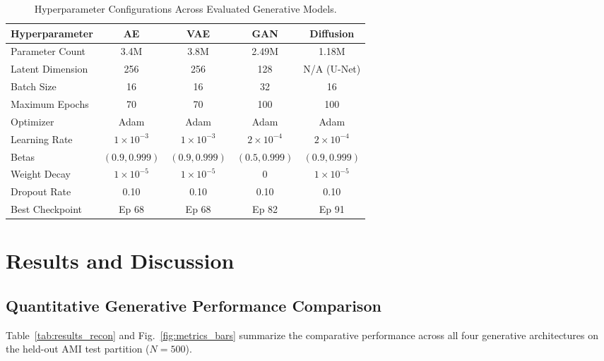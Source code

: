 \documentclass[conference]{IEEEtran}
\begin{document}
\begin{table}[h]
\caption{Hyperparameter Configurations Across Evaluated Generative Models.}
\label{tab:hyperparams}
\centering
\small
\begin{tabular}{lcccc}
\toprule
\textbf{Hyperparameter} & \textbf{AE} & \textbf{VAE} & \textbf{GAN} & \textbf{Diffusion} \\
\midrule
Parameter Count & 3.4M & 3.8M & 2.49M & 1.18M \\
Latent Dimension & 256 & 256 & 128 & N/A (U-Net) \\
Batch Size & 16 & 16 & 32 & 16 \\
Maximum Epochs & 70 & 70 & 100 & 100 \\
Optimizer & Adam & Adam & Adam & Adam \\
Learning Rate & $1\times 10^{-3}$ & $1\times 10^{-3}$ & $2\times 10^{-4}$ & $2\times 10^{-4}$ \\
Betas & $(0.9, 0.999)$ & $(0.9, 0.999)$ & $(0.5, 0.999)$ & $(0.9, 0.999)$ \\
Weight Decay & $1\times 10^{-5}$ & $1\times 10^{-5}$ & 0 & $1\times 10^{-5}$ \\
Dropout Rate & 0.10 & 0.10 & 0.10 & 0.10 \\
Best Checkpoint & Ep 68 & Ep 68 & Ep 82 & Ep 91 \\
\bottomrule
\end{tabular}
\end{table}

\section{Results and Discussion}
\label{sec:results}

\subsection{Quantitative Generative Performance Comparison}
Table~\ref{tab:results_recon} and Fig.~\ref{fig:metrics_bars} summarize the comparative performance across all four generative architectures on the held-out AMI test partition ($N = 500$).
\end{document}
